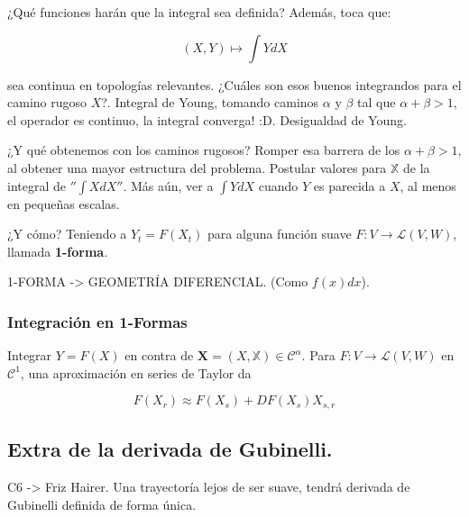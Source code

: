 ¿Qué funciones harán que la integral sea definida? Además, toca que:

\[
	(X,Y) \mapsto \int Y dX
\]

sea continua en topologías relevantes. ¿Cuáles son esos buenos integrandos para el camino rugoso $X$?. Integral de Young, tomando caminos $\alpha$ y $\beta$ tal que $\alpha + \beta > 1$, el operador es continuo, la integral converga! :D. Desigualdad de Young. 

¿Y qué obtenemos con los caminos rugosos? Romper esa barrera de los $\alpha + \beta > 1$, al obtener una mayor estructura del problema. Postular valores para $\mathbb{X}$ de la integral de $''\int X dX ''$. Más aún, ver a $\int Y dX$ cuando $Y$ es parecida a $X$, al menos en pequeñas escalas.

¿Y cómo? Teniendo a $Y_t = F(X_t)$ para alguna función suave $F: V \rightarrow \mathcal{L}(V,W)$, llamada \textbf{1-forma}.


1-FORMA -> GEOMETRÍA DIFERENCIAL. (Como $f(x) dx$).

\subsubsection{Integración en 1-Formas}

Integrar $Y = F(X)$ en contra de $\mathbf{X} = (X, \mathbb{X}) \in \mathscr{C}^{\alpha}$. Para $F: V \rightarrow \mathcal{L}(V,W)$ en $\mathcal{C}^1$, una aproximación en series de Taylor da

\[
	F(X_r) \approx F(X_s) + DF(X_s) X_{s,r}
\]




\subsection{Extra de la derivada de Gubinelli.}

C6 -> Friz Hairer. Una trayectoría lejos de ser suave, tendrá derivada de Gubinelli definida de forma única.